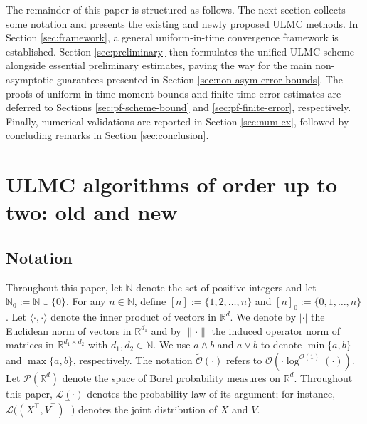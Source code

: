 \documentclass[12pt]{article}
\numberwithin{equation}{section}
\newcommand{\R}{\mathbb{R}}
\begin{document}
The remainder of this paper is structured as follows. The next section collects some notation and presents the existing and newly proposed ULMC methods. In Section \ref{sec:framework},  a general uniform-in-time convergence framework is established. Section \ref{sec:preliminary} then formulates the unified ULMC scheme alongside essential preliminary estimates, paving the way for the main non-asymptotic guarantees presented in Section \ref{sec:non-asym-error-bounds}. The proofs of uniform-in-time moment bounds and finite-time error estimates are deferred to Sections \ref{sec:pf-scheme-bound} and \ref{sec:pf-finite-error}, respectively. Finally, numerical validations are reported in Section \ref{sec:num-ex}, followed by concluding remarks in Section \ref{sec:conclusion}.

\section{ULMC algorithms of order up to two: old and new}
\label{sec:preliminaries}



\subsection{Notation}
Throughout this paper, let $\mathbb{N}$ denote the set of positive integers and let $\mathbb{N}_0 := \mathbb{N} \cup \{0\}$. For any $n \in \mathbb{N}$, define $[n] := \{1,2,\ldots,n\}$ and $[n]_0 := \{0,1,\ldots,n\}$.
Let $\langle\cdot,\cdot\rangle$ denote the inner product of vectors in $\R^{d}$. We denote by $|\cdot|$ the Euclidean norm of vectors in $\R^{d_1}$ and by $\|\cdot\|$ the induced operator norm of matrices in $\R^{d_1\times d_2}$ with $d_1,d_2\in \mathbb{N}$.
We use $a\wedge b$ and $a\vee b$ to denote $\min\{a,b\}$ and $\max\{a,b\}$, respectively. The notation $\widetilde{\mathcal{O}}(\cdot)$  refers to $\mathcal{O}(\cdot \log^{\mathcal{O}(1)}(\cdot))$.
Let $\mathcal{P}(\mathbb{R}^{d})$ denote the space of Borel probability measures on
$\mathbb{R}^{d}$.
Throughout this paper, $\mathcal{L}(\cdot)$ denotes the probability law of its argument; for instance,
$\mathcal{L}\big((X^\top,V^\top)^\top\big)$ denotes the joint distribution of $X$ and $V$.
\end{document}
